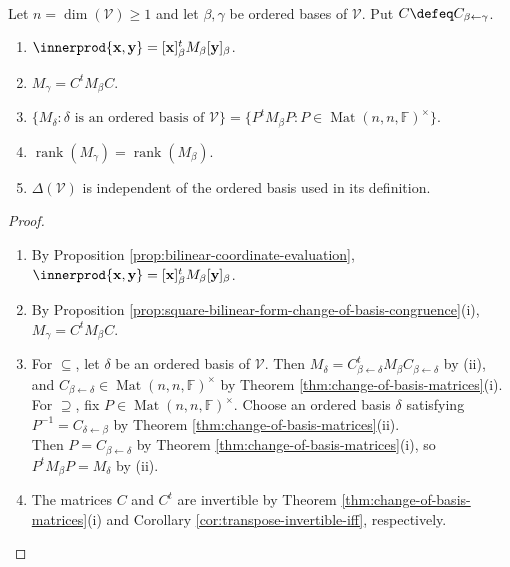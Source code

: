 \begin{proposition} \label{prop:metric-form-matrix-recovery-and-congruence} \\
Let $n=\dim(\mathcal{V})\geq1$ and let $\beta,\gamma$ be ordered bases of $\mathcal{V}$. Put $C\defeq C_{\beta\leftarrow\gamma}$.
\begin{enumerate}[label=(\roman*)]
\setlength{\itemsep}{0pt}
\item $\innerprod{\mathbf{x},\mathbf{y}}=[\mathbf{x}]_{\beta}^{t}M_{\beta}[\mathbf{y}]_{\beta}$.
\item $M_{\gamma}=C^tM_{\beta}C$.
\item $\{M_{\delta}:\delta\text{ is an ordered basis of }\mathcal{V}\}=\{P^tM_{\beta}P:P\in\operatorname{Mat}(n,n,\mathbb{F})^{\times}\}$.
\item $\operatorname{rank}(M_{\gamma})=\operatorname{rank}(M_{\beta})$.
\item $\Delta(\mathcal{V})$ is independent of the ordered basis used in its definition.
\end{enumerate}
\begin{proof}
\begin{enumerate}[label=(\roman*)]
\setlength{\itemsep}{0pt}
\item[$(i)$] By Proposition \ref{prop:bilinear-coordinate-evaluation}, $\innerprod{\mathbf{x},\mathbf{y}}=[\mathbf{x}]_{\beta}^{t}M_{\beta}[\mathbf{y}]_{\beta}$.
\item[$(ii)$] By Proposition \ref{prop:square-bilinear-form-change-of-basis-congruence}(i), $M_{\gamma}=C^tM_{\beta}C$.
\item[$(iii)$] For $\subseteq$, let $\delta$ be an ordered basis of $\mathcal{V}$. Then $M_{\delta}=C_{\beta\leftarrow\delta}^tM_{\beta}C_{\beta\leftarrow\delta}$ by (ii), and $C_{\beta\leftarrow\delta}\in\operatorname{Mat}(n,n,\mathbb{F})^{\times}$ by Theorem \ref{thm:change-of-basis-matrices}(i).\\
For $\supseteq$, fix $P\in\operatorname{Mat}(n,n,\mathbb{F})^{\times}$. Choose an ordered basis $\delta$ satisfying $P^{-1}=C_{\delta\leftarrow\beta}$ by Theorem \ref{thm:change-of-basis-matrices}(ii).\\
Then $P=C_{\beta\leftarrow\delta}$ by Theorem \ref{thm:change-of-basis-matrices}(i), so $P^tM_{\beta}P=M_{\delta}$ by (ii).
\item[$(iv)$] The matrices $C$ and $C^t$ are invertible by Theorem \ref{thm:change-of-basis-matrices}(i) and Corollary \ref{cor:transpose-invertible-iff}, respectively.\\

\end{enumerate}
\end{proof}
\end{proposition}
